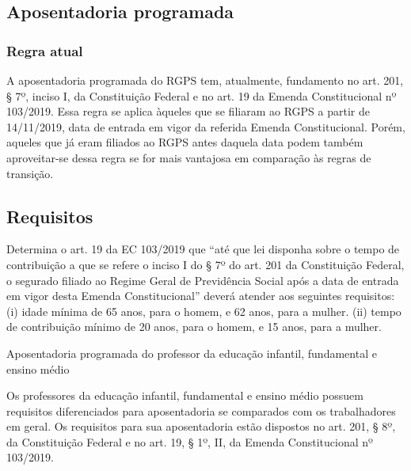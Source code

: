 \documentclass[
  letterpaper,
  DIV=11,
  numbers=noendperiod]{scrartcl}
\author{}
\date{}
\begin{document}
\ifdefined\Shaded\renewenvironment{Shaded}{\begin{tcolorbox}[frame hidden, sharp corners, breakable, interior hidden, enhanced, boxrule=0pt, borderline west={3pt}{0pt}{shadecolor}]}{\end{tcolorbox}}\fi

\hypertarget{aposentadoria-programada}{%
\subsection{Aposentadoria programada}\label{aposentadoria-programada}}

\hypertarget{regra-atual}{%
\subsubsection{Regra atual}\label{regra-atual}}

A aposentadoria programada do RGPS tem, atualmente, fundamento no art.
201, § 7º, inciso I, da Constituição Federal e no art. 19 da Emenda
Constitucional nº 103/2019. Essa regra se aplica àqueles que se filiaram
ao RGPS a partir de 14/11/2019, data de entrada em vigor da referida
Emenda Constitucional. Porém, aqueles que já eram filiados ao RGPS antes
daquela data podem também aproveitar-se dessa regra se for mais
vantajosa em comparação às regras de transição.

\hypertarget{requisitos}{%
\subsection{Requisitos}\label{requisitos}}

Determina o art. 19 da EC 103/2019 que ``até que lei disponha sobre o
tempo de contribuição a que se refere o inciso I do § 7º do art. 201 da
Constituição Federal, o segurado filiado ao Regime Geral de Previdência
Social após a data de entrada em vigor desta Emenda Constitucional''
deverá atender aos seguintes requisitos: (i) idade mínima de 65 anos,
para o homem, e 62 anos, para a mulher. (ii) tempo de contribuição
mínimo de 20 anos, para o homem, e 15 anos, para a mulher.

Aposentadoria programada do professor da educação infantil, fundamental
e ensino médio

Os professores da educação infantil, fundamental e ensino médio possuem
requisitos diferenciados para aposentadoria se comparados com os
trabalhadores em geral. Os requisitos para sua aposentadoria estão
dispostos no art. 201, § 8º, da Constituição Federal e no art. 19, § 1º,
II, da Emenda Constitucional nº 103/2019.
\end{document}

